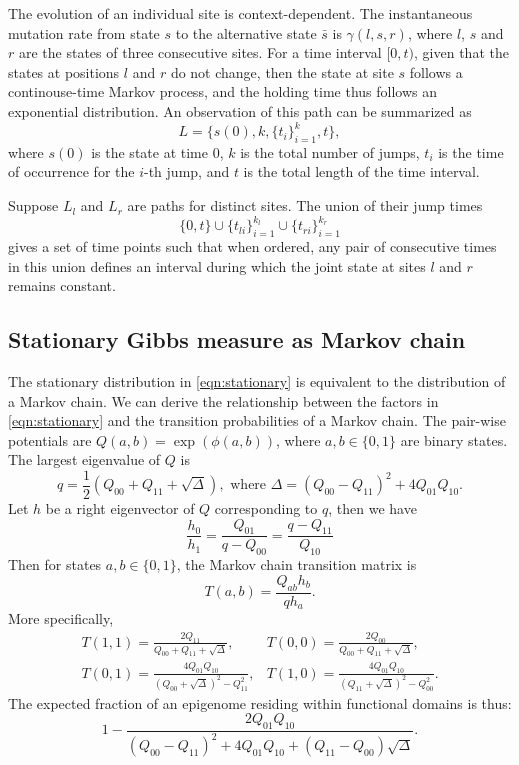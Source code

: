 \documentclass[11pt]{article}
\begin{document}
The evolution of an individual site is context-dependent. The
instantaneous mutation rate from state $s$ to the alternative state
$\bar{s}$ is $\gamma(l, s, r)$, where $l$, $s$ and $r$ are the states
of three consecutive sites.  For a time interval $[0,t)$, given that
the states at positions $l$ and $r$ do not change, then the state
at site $s$ follows a continouse-time Markov process, and the holding
time thus follows an exponential distribution. An observation of
this path can be summarized as
\[
  L = \big\{s(0), k, \{t_i\}_{i=1}^{k}, t \big\},
\]
where $s(0)$ is the state at time 0, $k$ is the total number of jumps,
$t_i$ is the time of occurrence for the $i$-th jump, and $t$ is the total
length of the time interval.

Suppose $L_l$ and $L_r$ are paths for distinct sites. The union of their jump times
\[
  \{0, t\} \cup \{t_{li}\}_{i=1}^{k_l} \cup \{t_{ri}\}_{i=1}^{k_r}
\]
gives a set of time points such that when ordered, any pair
of consecutive times in this union defines an interval during
which the joint state at sites $l$ and $r$ remains
constant.

\subsection{Stationary Gibbs measure as Markov chain}

The stationary distribution in \eqref{eqn:stationary} is equivalent to
the distribution of a Markov chain. We can derive the relationship
between the factors in \eqref{eqn:stationary} and the transition
probabilities of a Markov chain. The pair-wise potentials are
$Q(a,b)=\exp(\phi(a, b))$, where $a, b\in\{0,1\}$ are binary
states. The largest eigenvalue of $Q$ is
\[
q=\frac{1}{2}\left(Q_{00}+Q_{11} +\sqrt{\Delta}\right), \text{ where }
\Delta=(Q_{00} - Q_{11})^2 + 4Q_{01}Q_{10}.
\]
Let $h$ be a right eigenvector of $Q$ corresponding to $q$, then we have
\[
\frac{h_0}{h_1} = \frac{Q_{01}}{q-Q_{00}} = \frac{q-Q_{11}}{Q_{10}}
\]
Then for states $a, b\in \{0, 1\}$, the Markov chain transition matrix
is
\[
  T(a, b) = \frac{Q_{ab}h_b}{qh_{a}}.
\]
More specifically,
\begin{equation} \label{eqn:gibbs2markov}
  \begin{array}{ll}
    T(1,1) = \displaystyle\frac{2Q_{11}}{Q_{00}+Q_{11}+\sqrt{\Delta}}, &
    T(0,0) = \displaystyle\frac{2Q_{00}}{Q_{00}+Q_{11}+\sqrt{\Delta}}, \\[2em]
    T(0,1) = \displaystyle\frac{4Q_{01}Q_{10}}{(Q_{00}+\sqrt{\Delta})^2 -Q_{11}^2}, &
    T(1,0) = \displaystyle\frac{4Q_{01}Q_{10}}{(Q_{11}+\sqrt{\Delta})^2 -Q_{00}^2}.
  \end{array}
\end{equation}
The expected fraction of an epigenome residing within
functional domains is thus:
\[
1- \frac{2Q_{01}Q_{10}}{(Q_{00}-Q_{11})^2 + 4Q_{01}Q_{10} +
  (Q_{11}-Q_{00})\sqrt{\Delta}}.
\]
\end{document}
